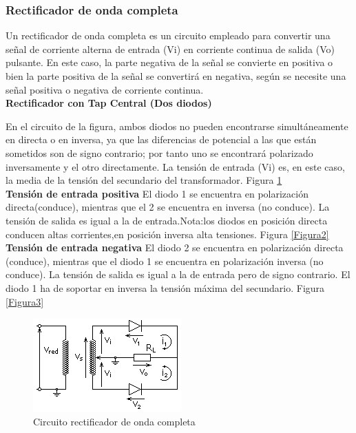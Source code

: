 \documentclass[a4paper,12pt]{article}
\begin{document}
\subsubsection{Rectificador de onda completa}
\indent Un rectificador de onda completa es un circuito empleado para convertir una señal de corriente alterna de entrada (Vi) en corriente continua de salida (Vo) pulsante. En este caso, la parte negativa de la señal se convierte en positiva o bien la parte positiva de la señal se convertirá en negativa, según se necesite una señal positiva o negativa de corriente continua.\\

\textbf{Rectificador con Tap Central (Dos diodos)}

\indent En el circuito de la figura, ambos diodos no pueden encontrarse simultáneamente en directa o en inversa, ya que las diferencias de potencial a las que están sometidos son de signo contrario; por tanto uno se encontrará polarizado inversamente y el otro directamente. La tensión de entrada (Vi) es, en este caso, la media de la tensión del secundario del transformador. Figura \ref{Figura1}\\

\textbf{Tensión de entrada positiva} \indent El diodo 1 se encuentra en polarización directa(conduce), mientras que el 2 se encuentra en inversa (no conduce). La tensión de salida es igual a la de entrada.Nota:los diodos en posición directa conducen altas corrientes,en posición inversa alta tensiones. Figura \ref{Figura2}\\

\textbf{Tensión de entrada negativa} \indent El diodo 2 se encuentra en polarización directa (conduce), mientras que el diodo 1 se encuentra en polarización inversa (no conduce). La tensión de salida es igual a la de entrada pero de signo contrario. El diodo 1 ha de soportar en inversa la tensión máxima del secundario. Figura \ref{Figura3}\\

\begin{figure}
  \begin{center}
    \includegraphics{images/Circuito_rectificador_onda_completa.png}
    \caption{Circuito rectificador de onda completa}
    \label{Figura1}
  \end{center}
\end{figure}
\end{document}
